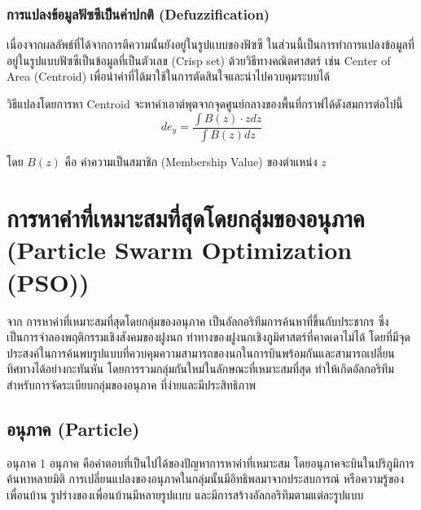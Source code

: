 \subsubsection{การแปลงข้อมูลฟัซซีเป็นค่าปกติ (Defuzzification)}
เนื่องจากผลลัพธ์ที่ได้จากการตีความนั้นยังอยู่ในรูปแบบของฟัซซี ในส่วนนี้เป็นการทำการแปลงข้อมูลที่อยู่ในรูปแบบฟัซซีเป็นข้อมูลที่เป็นตัวเลข (Crisp set) ด้วยวิธีทางคณิตศาสตร์ เช่น Center of Area (Centroid) เพื่อนำค่าที่ได้มาใช้ในการตัดสินใจและนำไปควบคุมระบบได้

วิธีแปลงโดยการหา Centroid จะหาค่าเอาต์พุตจากจุดศูนย์กลางของพื้นที่กราฟได้ดังสมการต่อไปนี้
\begin{equation}
  de_y = \frac{\int B(z)\cdot zdz}{\int B(z)dz}
  \label{eq:centroid}
\end{equation}

โดย \(B(z)\) คือ ค่าความเป็นสมาชิก (Membership Value) ของตำแหน่ง \(z\)

\section{การหาค่าที่เหมาะสมที่สุดโดยกลุ่มของอนุภาค (Particle Swarm Optimization (PSO))}
จาก \cite{Sansanee} การหาค่าที่เหมาะสมที่สุดโดยกลุ่มของอนุภาค เป็นอัลกอริทึมการค้นหาที่ขึ้นกับประชากร ซึ่งเป็นการจำลองพฤติกรรมเชิงสังคมของฝูงนก ท่าทางของฝูงนกเชิงภูมิศาสตร์ที่คาดเดาไม่ได้ โดยที่มีจุดประสงค์ในการค้นพบรูปแบบที่ควบคุมความสามารถของนกในการบินพร้อมกันและสามารถเปลี่ยนทิศทางได้อย่างกะทันหัน โดยการรวมกลุ่มกันใหม่ในลักษณะที่เหมาะสมที่สุด ทำให้เกิดอัลกอริทึมสำหรับการจัดระเบียบกลุ่มของอนุภาค ที่ง่ายและมีประสิทธิภาพ

\subsection{อนุภาค (Particle)}
อนุภาค 1 อนุภาค คือคำตอบที่เป็นไปได้ของปัญหาการหาค่าที่เหมาะสม โดยอนุภาคจะบินในปริภูมิการค้นหาหลายมิติ การเปลี่ยนแปลงของอนุภาคในกลุ่มนั้นมีอิทธิพลมาจากประสบการณ์ หรือความรู้ของเพื่อนบ้าน รูปร่างของเพื่อนบ้านมีหลายรูปแบบ และมีการสร้างอัลกอริทึมตามแต่ละรูปแบบ

